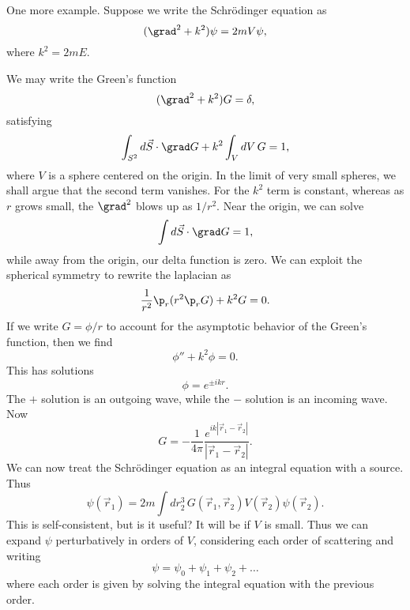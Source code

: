 One more example. Suppose we write the Schr\"odinger equation as
\begin{equation}
    (\grad^2 + k^2) \psi = 2mV \psi,
\end{equation}
where $k^2 = 2mE$.

We may write the Green's function
\begin{equation}
    (\grad^2 +k^2)G =\delta,
\end{equation}
satisfying
\begin{equation}
    \int_{S^2} d\vec{S} \cdot \grad G + k^2 \int_V dV \,G = 1,
\end{equation}
where $V$ is a sphere centered on the origin. In the limit of very small spheres, we shall argue that the second term vanishes. For the $k^2$ term is constant, whereas as $r$ grows small, the $\grad^2$ blows up as $1/r^2$. Near the origin, we can solve
\begin{equation}
    \int d\vec{S} \cdot \grad G =1,
\end{equation}
while away from the origin, our delta function is zero. We can exploit the spherical symmetry to rewrite the laplacian as
\begin{equation}
    \frac{1}{r^2} \p_r(r^2 \p_r G) + k^2 G =0.
\end{equation}
If we write $G=\phi/r$ to account for the asymptotic behavior of the Green's function, then we find
\begin{equation}
    \phi'' + k^2 \phi=0.
\end{equation}
This has solutions
\begin{equation}
    \phi = e^{\pm ikr}.
\end{equation}
The $+$ solution is an outgoing wave, while the $-$ solution is an incoming wave. Now
\begin{equation}
    G = -\frac{1}{4\pi} \frac{e^{ik |\vec r_1 - \vec r_2|}}{|\vec r_1 - \vec r_2|}.
\end{equation}
We can now treat the Schr\"odinger equation as an integral equation with a source. Thus
\begin{equation}
    \psi(\vec r_1) = 2m \int dr_2^3\, G(\vec r_1, \vec r_2) V(\vec r_2) \psi(\vec r_2).
\end{equation}
This is self-consistent, but is it useful? It will be if $V$ is small. Thus we can expand $\psi$ perturbatively in orders of $V$, considering each order of scattering and writing
\begin{equation}
    \psi = \psi_0 + \psi_1 + \psi_2 + \dots
\end{equation}
where each order is given by solving the integral equation with the previous order.